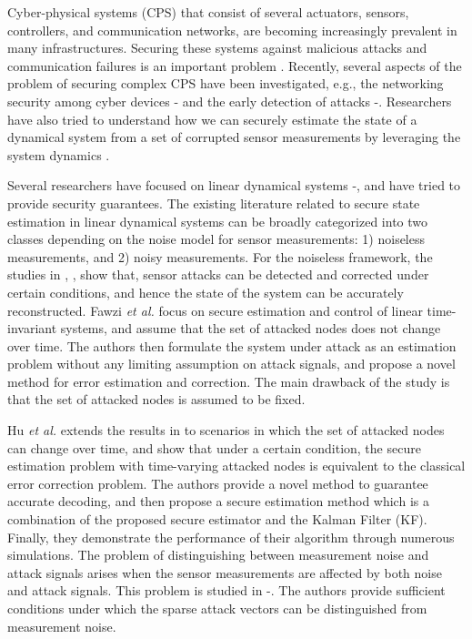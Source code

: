 \documentclass[../thesis.tex]{subfiles}
\begin{document}


Cyber-physical systems (CPS) that consist of several actuators, sensors, controllers, and communication networks, are becoming increasingly prevalent in many infrastructures. Securing these systems against malicious attacks and communication failures is an important problem \cite{cps1}. Recently, several aspects of the problem of securing complex CPS have been investigated, e.g., the networking security among cyber devices \cite{security_0}-\!\!\cite{comm_net_4} and the early detection of attacks \cite{comm_early_1}-\!\!\cite{comm_early_2}. Researchers have also tried to understand how we can securely estimate the state of a dynamical system from a set of corrupted sensor measurements by leveraging the system dynamics \cite{Fawzi:2014}.



Several researchers have focused on linear dynamical systems \cite{Fawzi:2014}-\!\!\cite{new4}, and have tried to provide security guarantees. The existing literature related to secure state estimation in linear dynamical systems can be broadly categorized into two classes depending on the noise model for sensor measurements: 1) noiseless measurements, and 2) noisy measurements. For the noiseless framework, the studies in \cite{cps1}, \cite{Fawzi:2014}, \cite{new2} show that, sensor attacks can be detected and corrected under certain conditions, and hence the state of the system can be accurately reconstructed. Fawzi \textit{et al.} \cite{Fawzi:2014} focus on secure estimation and control of linear time-invariant systems, and assume that the set of attacked nodes does not change over time. The authors then formulate the system under attack as an estimation problem without any limiting assumption on attack signals, and propose a novel method for error estimation and correction. The main drawback of the study is that the set of attacked nodes is assumed to be fixed.

Hu \textit{et al.} \cite{Hu:2016uav} extends the results in \cite{Fawzi:2014} to scenarios in which the set of attacked nodes can change over time, and show that under a certain condition, the secure estimation problem with time-varying attacked nodes is equivalent to the classical error correction problem. The authors provide a novel method to guarantee accurate decoding, and then propose a secure estimation method which is a combination of the proposed secure estimator and the Kalman Filter (KF). Finally, they demonstrate the performance of their algorithm through numerous simulations. The problem of distinguishing between measurement noise and attack signals arises when the sensor measurements are affected by both noise and attack signals. This problem is studied in \cite{new4}-\!\!\cite{new10}. The authors provide sufficient conditions under which the
sparse attack vectors can be distinguished from measurement noise.
\end{document}
